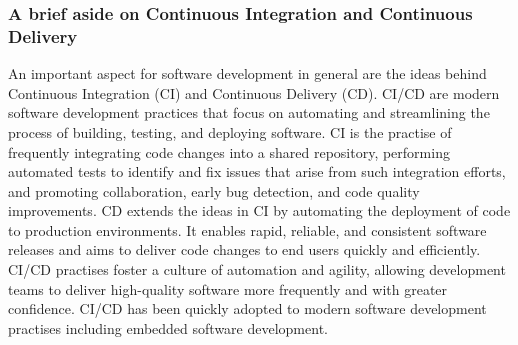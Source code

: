 \subsubsection{A brief aside on Continuous Integration and Continuous Delivery}

An important aspect for software development in general are the ideas behind Continuous Integration (CI) and Continuous Delivery (CD). CI/CD are modern software development practices that focus on automating and streamlining the process of building, testing, and deploying software. CI is the practise of frequently integrating code changes into a shared repository, performing automated tests to identify and fix issues that arise from such integration efforts, and promoting collaboration, early bug detection, and code quality improvements. CD extends the ideas in CI by automating the deployment of code to production environments. It enables rapid, reliable, and consistent software releases and aims to deliver code changes to end users quickly and efficiently. CI/CD practises foster a culture of automation and agility, allowing development teams to deliver high-quality software more frequently and with greater confidence. CI/CD has been quickly adopted to modern software development practises including embedded software development.


